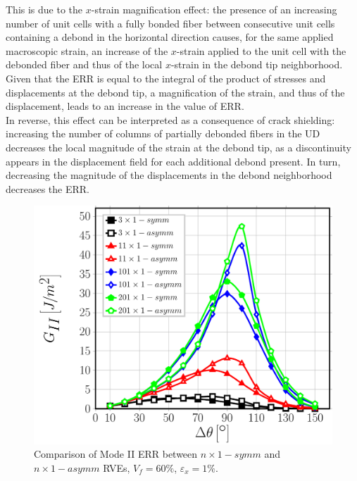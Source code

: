 This is due to the $x$-strain magnification effect: the presence of an increasing number of unit cells with a fully bonded fiber between consecutive unit cells containing a debond in the horizontal direction causes, for the same applied macroscopic strain, an increase of the $x$-strain applied to the unit cell with the debonded fiber and thus of the local $x$-strain in the debond tip neighborhood. Given that the ERR is equal to the integral of the product of stresses and displacements at the debond tip, a magnification of the strain, and thus of the displacement, leads to an increase in the value of ERR.\\
In reverse, this effect can be interpreted as a consequence of crack shielding: increasing the number of columns of partially debonded fibers in the UD decreases the local magnitude of the strain at the debond tip, as a discontinuity appears in the displacement field for each additional debond present. In turn, decreasing the magnitude of the displacements in the debond neighborhood decreases the ERR.

\begin{figure}[!htb]
\centering
  \includegraphics[width=\textwidth]{paperD/nx1-coupling-vf60-GII.pdf}
\caption{Comparison of Mode II ERR between $n \times 1-symm$ and $n \times 1-asymm$ RVEs, $V_{f}=60\%$, $\varepsilon_{x}=1\%$.}\label{paperD:fig:nx1-GII}
\end{figure}

